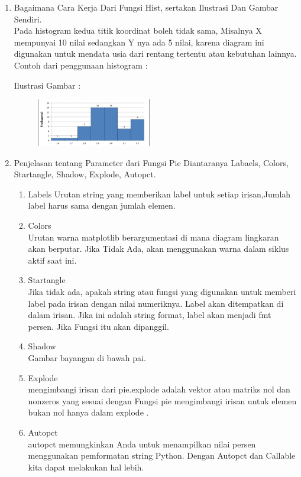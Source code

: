\begin{enumerate}
\item Bagaimana Cara Kerja Dari Fungsi Hist, sertakan Ilustrasi Dan Gambar Sendiri.\\

Pada histogram kedua titik koordinat boleh tidak sama, Misalnya X mempunyai 10 nilai sedangkan Y nya ada 5 nilai, 
karena diagram ini digunakan untuk mendata usia dari rentang tertentu atau kebutuhan lainnya.
Contoh dari penggunaan histogram :


Ilustrasi Gambar :
	\begin{figure}[ht!]
	\includegraphics[width=5cm]{figures/6/1174062/histogram.png}
	\centering
	\end{figure}


\item Penjelasan tentang Parameter dari Fungsi Pie Diantaranya Labaels, Colors, Startangle, Shadow, Explode, Autopct.

\begin{enumerate}
\item Labels
Urutan string yang memberikan label untuk setiap irisan,Jumlah label harus sama dengan jumlah elemen.
\item Colors \\
Urutan warna matplotlib berargumentasi di mana diagram lingkaran akan berputar. Jika Tidak Ada, akan menggunakan warna dalam siklus aktif saat ini.
\item Startangle \\
Jika tidak ada, apakah string atau fungsi yang digunakan untuk memberi label pada irisan dengan nilai numeriknya. 
Label akan ditempatkan di dalam irisan. Jika ini adalah string format, label akan menjadi fmt persen. Jika Fungsi itu akan dipanggil.
\item Shadow \\
Gambar bayangan di bawah pai.
\item Explode \\
mengimbangi irisan dari pie.explode adalah vektor atau matriks nol dan nonzeros yang sesuai dengan Fungsi pie mengimbangi 
irisan untuk elemen bukan nol hanya dalam explode .
\item Autopct \\
autopct memungkinkan Anda untuk menampilkan nilai persen menggunakan pemformatan string Python. Dengan Autopct dan Callable kita dapat melakukan hal lebih.


\end{enumerate}
\end{enumerate}
